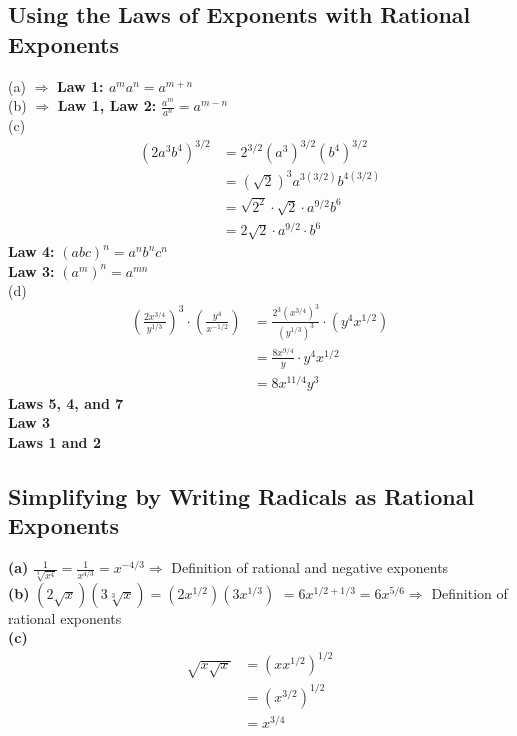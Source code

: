 \subsection{Using the Laws of Exponents with Rational Exponents}
(a)  $\Rightarrow$
\textbf{Law 1: $a^m a^n=a^{m+n}$} \\ \break
(b)  $\Rightarrow$
\textbf{Law 1, Law 2:} $\frac{a^m}{a^n}=a^{m-n}$ \\ \break
(c)
$$
\begin{aligned}
\left(2 a^3 b^4\right)^{3 / 2} & =2^{3 / 2}\left(a^3\right)^{3 / 2}\left(b^4\right)^{3 / 2} \\
& =(\sqrt{2})^3 a^{3(3 / 2)} b^{4(3 / 2)} \\
& = \sqrt{2^2} \cdot \sqrt{2} \cdot a^{9 / 2} b^{6} \\
& =2 \sqrt{2} \cdot a^{9 / 2} \cdot b^6
\end{aligned}
$$
\textbf{Law 4:} $(a b c)^n=a^n b^n c^n$ \\
\textbf{Law 3:} $\left(a^m\right)^n=a^{m n}$ \\ \break
(d)
$$
\begin{aligned}
\left(\frac{2 x^{3 / 4}}{y^{1 / 3}}\right)^3 \cdot \left(\frac{y^4}{x^{-1 / 2}}\right) & =\frac{2^3\left(x^{3 / 4}\right)^3}{\left(y^{1 / 3}\right)^3} \cdot\left(y^4 x^{1 / 2}\right) \\
& =\frac{8 x^{9 / 4}}{y} \cdot y^4 x^{1 / 2} \\
& =8 x^{11 / 4} y^3
\end{aligned}
$$
\textbf{Laws 5, 4, and 7 \\
Law 3 \\
Laws 1 and 2}

\subsection{Simplifying by Writing Radicals as Rational Exponents}
\textbf{(a)} $\displaystyle \frac{1}{\sqrt[3]{x^4}}=\frac{1}{x^{4 / 3}}=x^{-4 / 3} \Rightarrow$ Definition of rational and negative exponents \\ \break
\textbf{(b)} $(2 \sqrt{x})(3 \sqrt[3]{x})=\left(2 x^{1 / 2}\right)\left(3 x^{1 / 3}\right)$ $=6 x^{1 / 2+1 / 3}=6 x^{5 / 6} \Rightarrow$ Definition of rational exponents \\ \break 
\textbf{(c)}
$$
\begin{aligned}
\sqrt{x \sqrt{x}} & =\left(x x^{1 / 2}\right)^{1 / 2} \\
& =\left(x^{3 / 2}\right)^{1 / 2} \\
& =x^{3 / 4}
\end{aligned}
$$


